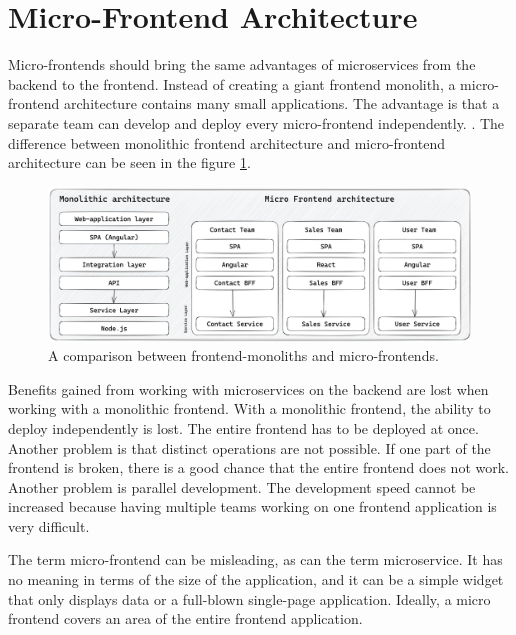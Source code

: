 \section{Micro-Frontend Architecture}\label{section:background:micro-frontend-architecture}

Micro-frontends should bring the same advantages of microservices from the backend to the frontend. Instead of creating a giant frontend monolith, a micro-frontend architecture contains many small applications. The advantage is that a separate team can develop and deploy every micro-frontend independently. \cite{book:2020:geers:background:micro-frontends:micro-frontends-in-action}. The difference between monolithic frontend architecture and micro-frontend architecture can be seen in the figure \ref{fig:background:micro-frontend:monolith-micro-frontend-comparison}.

\ifshowImages
\begin{figure}[H]
    \centering
    \includegraphics[width=1\linewidth]{images/background/micro-frontends/monolith-micro-frontends-comparison.png}
    \caption{A comparison between frontend-monoliths and micro-frontends.}\label{fig:background:micro-frontend:monolith-micro-frontend-comparison}
\end{figure}
\fi

\noindent Benefits gained from working with microservices on the backend are lost when working with a monolithic frontend. With a monolithic frontend, the ability to deploy independently is lost. The entire frontend has to be deployed at once. Another problem is that distinct operations are not possible. If one part of the frontend is broken, there is a good chance that the entire frontend does not work. Another problem is parallel development. The development speed cannot be increased because having multiple teams working on one frontend application is very difficult. \cite{misc:2019:leitner:background:micro-frontends:micro-frontends-basics}

\bigskip

\noindent The term micro-frontend can be misleading, as can the term microservice. It has no meaning in terms of the size of the application, and it can be a simple widget that only displays data or a full-blown single-page application. Ideally, a micro frontend covers an area of the entire frontend application.

